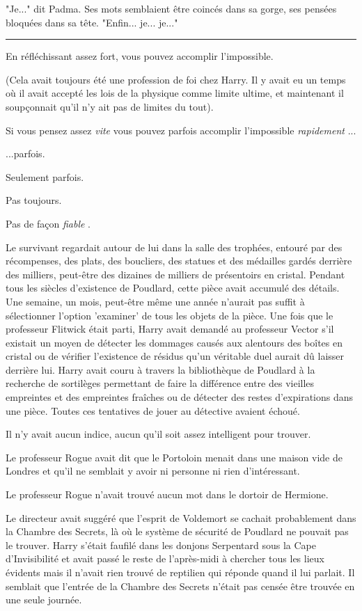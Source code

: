 "Je..." dit Padma. Ses mots semblaient être coincés dans sa gorge, ses pensées bloquées dans sa tête. "Enfin... je... je..."
\par\noindent\rule{\textwidth}{0.4pt}
En réfléchissant assez fort, vous pouvez accomplir l'impossible.

(Cela avait toujours été une profession de foi chez Harry. Il y avait eu un temps où il avait accepté les lois de la physique comme limite ultime, et maintenant il soupçonnait qu'il n'y ait pas de limites du tout).

Si vous pensez assez \emph{vite}  vous pouvez parfois accomplir l'impossible \emph{rapidement} ...

...parfois.

Seulement parfois.

Pas toujours.

Pas de façon \emph{fiable} .

Le survivant regardait autour de lui dans la salle des trophées, entouré par des récompenses, des plats, des boucliers, des statues et des médailles gardés derrière des milliers, peut-être des dizaines de milliers de présentoirs en cristal. Pendant tous les siècles d'existence de Poudlard, cette pièce avait accumulé des détails. Une semaine, un mois, peut-être même une année n'aurait pas suffit à sélectionner l'option 'examiner' de tous les objets de la pièce. Une fois que le professeur Flitwick était parti, Harry avait demandé au professeur Vector s'il existait un moyen de détecter les dommages causés aux alentours des boîtes en cristal ou de vérifier l'existence de résidus qu'un véritable duel aurait dû laisser derrière lui. Harry avait couru à travers la bibliothèque de Poudlard à la recherche de sortilèges permettant de faire la différence entre des vieilles empreintes et des empreintes fraîches ou de détecter des restes d'expirations dans une pièce. Toutes ces tentatives de jouer au détective avaient échoué.

Il n'y avait aucun indice, aucun qu'il soit assez intelligent pour trouver.

Le professeur Rogue avait dit que le Portoloin menait dans une maison vide de Londres et qu'il ne semblait y avoir ni personne ni rien d'intéressant.

Le professeur Rogue n'avait trouvé aucun mot dans le dortoir de Hermione.

Le directeur avait suggéré que l'esprit de Voldemort se cachait probablement dans la Chambre des Secrets, là où le système de sécurité de Poudlard ne pouvait pas le trouver. Harry s'était faufilé dans les donjons Serpentard sous la Cape d'Invisibilité et avait passé le reste de l'après-midi à chercher tous les lieux évidents mais il n'avait rien trouvé de reptilien qui réponde quand il lui parlait. Il semblait que l'entrée de la Chambre des Secrets n'était pas censée être trouvée en une seule journée.

